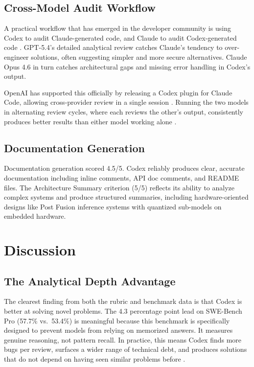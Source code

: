 \documentclass[conference]{IEEEtran}
\begin{document}
\subsection{Cross-Model Audit Workflow}
A practical workflow that has emerged in the developer community is using Codex to audit Claude-generated code, and Claude to audit Codex-generated code \cite{chandler2026}. GPT-5.4's detailed analytical review catches Claude's tendency to over-engineer solutions, often suggesting simpler and more secure alternatives. Claude Opus 4.6 in turn catches architectural gaps and missing error handling in Codex's output.

OpenAI has supported this officially by releasing a Codex plugin for Claude Code, allowing cross-provider review in a single session \cite{mindstudio2026}. Running the two models in alternating review cycles, where each reviews the other's output, consistently produces better results than either model working alone \cite{chandler2026}.

\subsection{Documentation Generation}
Documentation generation scored 4.5/5. Codex reliably produces clear, accurate documentation including inline comments, API doc comments, and README files. The Architecture Summary criterion (5/5) reflects its ability to analyze complex systems and produce structured summaries, including hardware-oriented designs like Post Fusion inference systems with quantized sub-models on embedded hardware.

\section{Discussion}

\subsection{The Analytical Depth Advantage}
The clearest finding from both the rubric and benchmark data is that Codex is better at solving novel problems. The 4.3 percentage point lead on SWE-Bench Pro (57.7\% vs.\ 53.4\%) is meaningful because this benchmark is specifically designed to prevent models from relying on memorized answers. It measures genuine reasoning, not pattern recall. In practice, this means Codex finds more bugs per review, surfaces a wider range of technical debt, and produces solutions that do not depend on having seen similar problems before \cite{chandler2026}.
\end{document}
